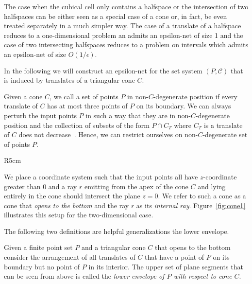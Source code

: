 \documentclass{stacs_proc}
\newcommand{\bigO}{O}
\newcommand{\C}{\mathcal{C}}
\begin{document}
The case when the cubical cell only contains a halfspace or the
intersection of two halfspaces can be either seen as a special case of
a cone or, in fact, be even treated separately in a much simpler
way. The case of a translate of a halfspace reduces to a
one-dimensional problem an admits an epsilon-net of size 1 and the
case of two intersecting halfspaces reduces to a problem on intervals
which admits an epsilon-net of size $\bigO(1/ \epsilon)$. 

In the following we will construct an epsilon-net for the set system
$(P, \C)$ that is induced by translates of a 
triangular cone $C$. 

Given a cone $C$, we call a set of points $P$ in non-$C$-degenerate
position if every translate of $C$ has at most three points of $P$ on
its boundary. We can always perturb the input points $P$ in such a way
that they are in non-$C$-degenerate position and the collection of
subsets of the form $P\cap C_T$ where $C_T$ is a translate of $C$ does
not decrease~\cite{EW85}. Hence, we can restrict ourselves on
non-$C$-degenerate set of points $P$.  

\begin{wrapfigure}[11]{R}{5cm}
  \begin{center}
    \caption{The cone $C$ and its internal ray $r$.}
    \label{fig:cone1}
  \end{center}
\end{wrapfigure}
We place a
coordinate system  such that the input points all have $z$-coordinate
greater than $0$ and a ray $r$ emitting from the apex of the cone $C$ and
lying entirely in the cone should intersect the plane $z=0$. We refer
to such a cone as a cone that \emph{opens to the bottom} and the ray $r$ as
its \emph{internal ray}.
Figure~\ref{fig:cone1} illustrates this setup for the two-dimensional
case.


The following two definitions are helpful generalizations the lower
envelope. 



\begin{defi}
  Given a finite point set $P$ and a triangular cone $C$ that opens to
  the bottom consider the arrangement 
  of all translates of $C$ that have a point of $P$ on its boundary
  but no point of $P$ in its interior. The upper set of plane segments
  that can be seen from above is called the \emph{lower envelope of
    $P$ with respect to cone $C$}.
\end{defi}
\end{document}
